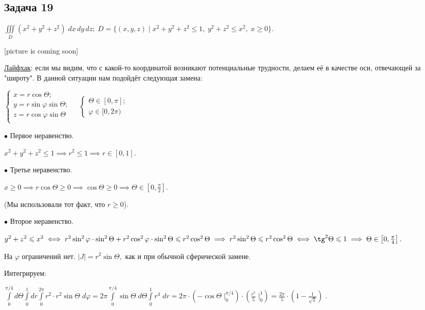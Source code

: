 \documentclass[a4paper, fleqn]{article}
\begin{document}
    
    \subsection*{Задача 19}
    
    $\displaystyle \iiint\limits_{D} (x^2 + y^2 + z^2) \; dx \, dy\, dz; \; D = \{(x,y,z) \mid x^2 + y^2 + z^2 \leq 1, \; y^2 + z^2 \leq x^2, \; x \geq 0 \}. $
    
    [picture is coming soon]
    
    \underline{Лайфхак}: если мы видим, что с какой-то координатой возникают потенциальные трудности, делаем её в качестве оси, отвечающей за "широту". В данной ситуации нам подойдёт следующая замена:
    
    $\begin{cases}
    x = r \cos \Theta;\\
    y = r \sin  \varphi \sin  \Theta;\\
    z = r \cos  \varphi \sin  \Theta \\
    \end{cases} \; \; \; \; 
    \begin{cases}
    \Theta \in [0,\pi];\\
    \varphi \in [0, 2 \pi)
    \end{cases}$
    
    $\bullet$ Первое неравенство.
    
    $x^2 + y^2 + z^2 \leq 1 \implies r^2 \leq 1 \implies r \in [0,1].$
    
    $\bullet$ Третье неравенство.
    
    $x \geq 0 \implies r \cos \Theta \geq 0 \implies \cos \Theta \geq 0 \implies \Theta \in \left[0, \frac{\pi}{2}\right]. $
    
    (Мы использовали тот факт, что $r \geq 0$).
    
    $\bullet$ Второе неравенство.
    
    $y^2 + z^2 \leq x^2 \iff
    r^2 \sin^2  \varphi \cdot \sin^2  \Theta +
    r^2 \cos^2  \varphi \cdot  \sin^2  \Theta \leq 
    r^2 \cos^2 \Theta \implies r^2 \sin^2 \Theta \leq r^2 \cos^2 \Theta \iff \tg^2 \Theta \leq 1 \implies \Theta \in \left[ 0, \frac{\pi}{4} \right].$
    
    На $\varphi$ ограничений нет. $|J| = r^2 \sin \Theta,$ как и при обычной сферической замене.
    
    Интегрируем:
    
    $\displaystyle \int \limits_{0}^{\pi /4} d\Theta  \int \limits_{0}^{1} dr  \int \limits_{0}^{2 \pi}   r^2 \cdot r^2 \sin \Theta \; d \varphi  = 2 \pi \int \limits_{0}^{\pi /4} \sin \Theta \;  d\Theta  \int \limits_{0}^{1}  r^4   \; dr = 2 \pi \cdot  \left( -\cos \Theta \;  \Bigg|_{0}^{\pi /4} \right) \cdot \left( \frac{r^5}{5} \; \Bigg|_0^1 \right) = \boxed{\frac{2\pi}{5} \cdot \left(1 - \frac{1}{\sqrt{2}} \right)} \; .$
    
\end{document}
